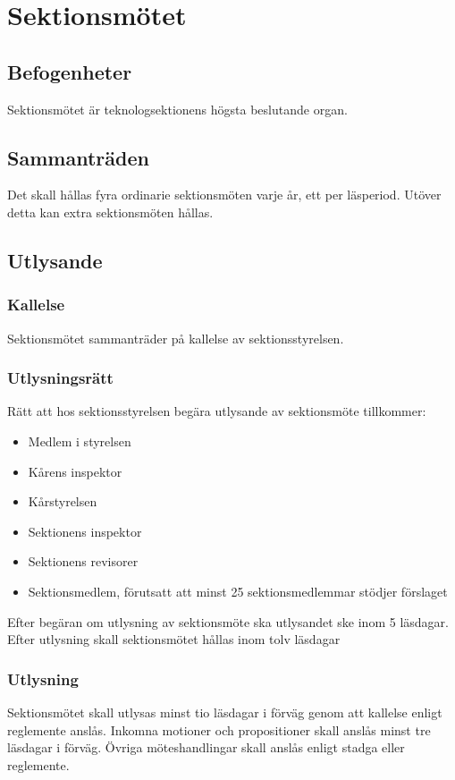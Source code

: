 \section{Sektionsmötet}

\subsection{Befogenheter}
Sektionsmötet är teknologsektionens högsta beslutande organ.

\subsection{Sammanträden}
Det skall hållas fyra ordinarie sektionsmöten varje år, ett per läsperiod. Utöver detta kan extra sektionsmöten hållas.

\subsection{Utlysande}
\label{sec:utlysande}

\subsubsection{Kallelse}
Sektionsmötet sammanträder på kallelse av sektionsstyrelsen.

\subsubsection{Utlysningsrätt}
Rätt att hos sektionsstyrelsen begära utlysande av sektionsmöte tillkommer:

\begin{itemize}
	\item Medlem i styrelsen
	\item Kårens inspektor
	\item Kårstyrelsen
	\item Sektionens inspektor
	\item Sektionens revisorer
	\item Sektionsmedlem, förutsatt att minst 25 sektionsmedlemmar stödjer förslaget
\end{itemize}

Efter begäran om utlysning av sektionsmöte ska utlysandet ske inom 5 läsdagar. Efter utlysning skall sektionsmötet hållas inom tolv läsdagar

\subsubsection{Utlysning}
Sektionsmötet skall utlysas minst tio läsdagar i förväg genom att kallelse enligt reglemente anslås. Inkomna motioner och propositioner skall anslås minst tre läsdagar i förväg. Övriga möteshandlingar skall anslås enligt stadga eller reglemente. 

